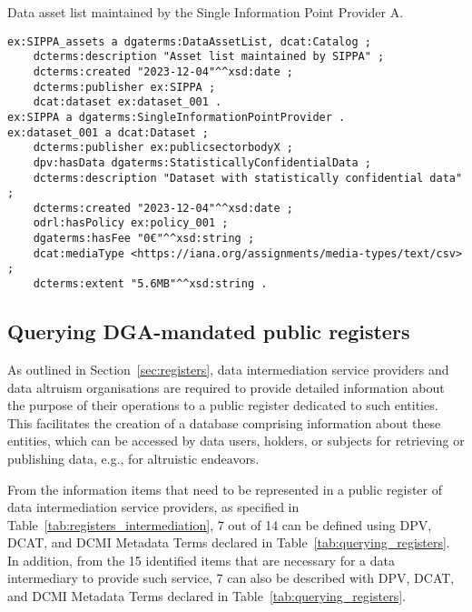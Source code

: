 \begin{listing}[ht]
\caption[Data asset list maintained by a single information point provider.]{Data asset list maintained by the Single Information Point Provider A.}
\label{list:data_asset_list}
\begin{verbatim}
ex:SIPPA_assets a dgaterms:DataAssetList, dcat:Catalog ;
    dcterms:description "Asset list maintained by SIPPA" ;
    dcterms:created "2023-12-04"^^xsd:date ;
    dcterms:publisher ex:SIPPA ;
    dcat:dataset ex:dataset_001 .
ex:SIPPA a dgaterms:SingleInformationPointProvider .
ex:dataset_001 a dcat:Dataset ;
    dcterms:publisher ex:publicsectorbodyX ;
    dpv:hasData dgaterms:StatisticallyConfidentialData ;
    dcterms:description "Dataset with statistically confidential data" ;
    dcterms:created "2023-12-04"^^xsd:date ; 
    odrl:hasPolicy ex:policy_001 ;
    dgaterms:hasFee "0€"^^xsd:string ;
    dcat:mediaType <https://iana.org/assignments/media-types/text/csv> ;
    dcterms:extent "5.6MB"^^xsd:string .
\end{verbatim}
\end{listing}

\subsection{Querying DGA-mandated public registers}
\label{sec:dga_registers}

As outlined in Section~\ref{sec:registers}, data intermediation service providers and data altruism organisations are required to provide detailed information about the purpose of their operations to a public register dedicated to such entities. 
This facilitates the creation of a database comprising information about these entities, which can be accessed by data users, holders, or subjects for retrieving or publishing data, e.g., for altruistic endeavors.

From the information items that need to be represented in a public register of data intermediation service providers, as specified in Table~\ref{tab:registers_intermediation}, 7 out of 14 can be defined using DPV, DCAT, and DCMI Metadata Terms declared in Table~\ref{tab:querying_registers}.
In addition, from the 15 identified items that are necessary for a data intermediary to provide such service, 7 can also be described with DPV, DCAT, and DCMI Metadata Terms declared in Table~\ref{tab:querying_registers}.

